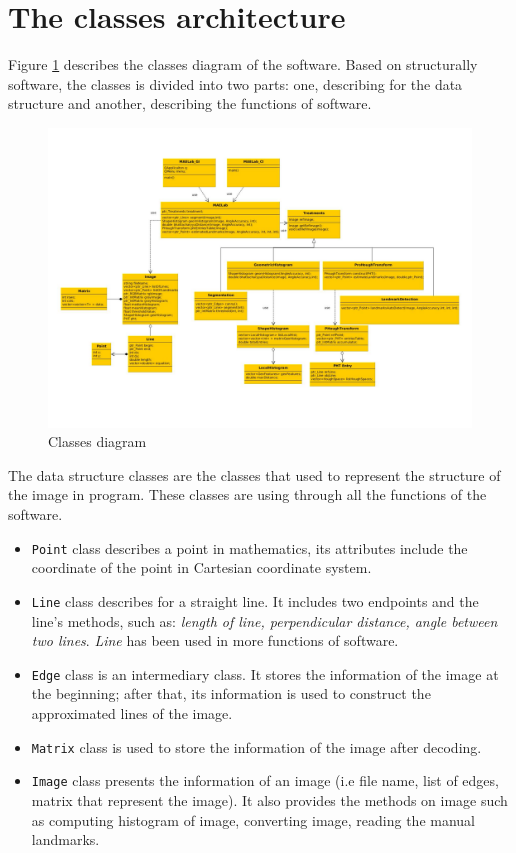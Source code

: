 \section{The classes architecture}
Figure \ref{figclassdiagram} describes the classes diagram of the software. Based on structurally software, the classes is divided into two parts: one, describing for the data structure and another, describing the functions of software.
\begin{figure}[h!]
	\centering
	\includegraphics[scale=0.85, angle = -90]{images/classDiagram}
	\caption{Classes diagram}
	\label{figclassdiagram}
\end{figure}
The data structure classes are the classes that used to represent the structure of the image in program. These classes are using through all the functions of the software.
\begin{itemize}
	\item \texttt{Point} class describes a point in mathematics, its attributes include the coordinate of the point in Cartesian coordinate system.
	\item \texttt{Line} class describes for a straight line. It includes two endpoints and the line's methods, such as: \textit{length of line, perpendicular distance, angle between two lines}. \textit{Line} has been used in more functions of software.
	\item \texttt{Edge} class is an intermediary class. It stores the information of the image at the beginning; after that, its information is used to construct the approximated lines of the image.
	\item \texttt{Matrix} class is used to store the information of the image after decoding.
	\item \texttt{Image} class presents the information of an image (i.e file name, list of edges, matrix that represent the image). It also provides the methods on image such as computing histogram of image, converting image, reading the manual landmarks.
\end{itemize} 
